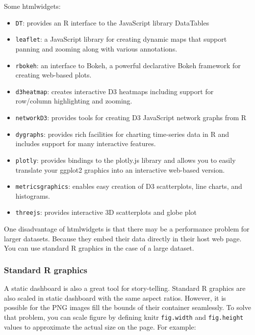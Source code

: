 \documentclass[]{book}
\providecommand{\tightlist}{%
  \setlength{\itemsep}{0pt}\setlength{\parskip}{0pt}}
\theoremstyle{definition}
\theoremstyle{definition}
\theoremstyle{remark}
\begin{document}
Some htmlwidgets:

\begin{itemize}
\tightlist
\item
  \texttt{DT}: provides an R interface to the JavaScript library
  DataTables
\item
  \texttt{leaflet}: a JavaScript library for creating dynamic maps that
  support panning and zooming along with various annotations.
\item
  \texttt{rbokeh}: an interface to Bokeh, a powerful declarative Bokeh
  framework for creating web-based plots.
\item
  \texttt{d3heatmap}: creates interactive D3 heatmaps including support
  for row/column highlighting and zooming.
\item
  \texttt{networkD3}: provides tools for creating D3 JavaScript network
  graphs from R
\item
  \texttt{dygraphs}: provides rich facilities for charting time-series
  data in R and includes support for many interactive features.
\item
  \texttt{plotly}: provides bindings to the plotly.js library and allows
  you to easily translate your ggplot2 graphics into an interactive
  web-based version.
\item
  \texttt{metricsgraphics}: enables easy creation of D3 scatterplots,
  line charts, and histograms.
\item
  \texttt{threejs}: provides interactive 3D scatterplots and globe plot
\end{itemize}

One disadvantage of htmlwidgets is that there may be a performance
problem for larger datasets. Because they embed their data directly in
their host web page. You can use standard R graphics in the case of a
large dataset.

\subsubsection{Standard R graphics}\label{standard-r-graphics}

A static dashboard is also a great tool for story-telling. Standard R
graphics are also scaled in static dashboard with the same aspect
ratios. However, it is possible for the PNG images fill the bounds of
their container seamlessly. To solve that problem, you can scale figure
by defining knitr \texttt{fig.width} and \texttt{fig.height} values to
approximate the actual size on the page. For example:
\end{document}
